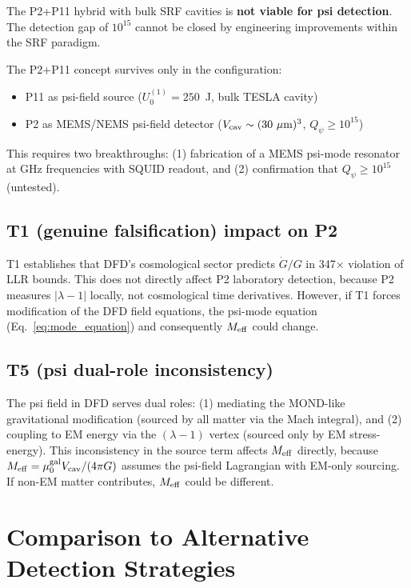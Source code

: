 \documentclass[11pt,twocolumn]{article}
\newcommand{\lam}{\lambda}
\newcommand{\Meff}{M_{\rm eff}}
\newcommand{\Qpsi}{Q_\psi}
\newcommand{\Vcav}{V_{\rm cav}}
\newcommand{\muG}{\mu_0^{\rm gal}}
\theoremstyle{definition}
\theoremstyle{remark}
\begin{document}
The P2+P11 hybrid with bulk SRF cavities is \textbf{not viable for psi
detection}. The detection gap of $10^{15}$ cannot be closed by engineering
improvements within the SRF paradigm.

The P2+P11 concept survives only in the configuration:
\begin{itemize}[nosep]
\item P11 as psi-field source ($U_0^{(1)} = 250$~J, bulk TESLA cavity)
\item P2 as MEMS/NEMS psi-field detector ($\Vcav \sim (30~\mu\text{m})^3$,
  $\Qpsi \geq 10^{15}$)
\end{itemize}

This requires two breakthroughs: (1) fabrication of a MEMS psi-mode
resonator at GHz frequencies with SQUID readout, and (2) confirmation
that $\Qpsi \geq 10^{15}$ (untested).

\subsection{T1 (genuine falsification) impact on P2}
\label{sec:T1_impact}

T1 establishes that DFD's cosmological sector predicts $\dot{G}/G$ in
347$\times$ violation of LLR bounds. This does not directly affect P2
laboratory detection, because P2 measures $|\lam-1|$ locally, not
cosmological time derivatives. However, if T1 forces modification of
the DFD field equations, the psi-mode equation
(Eq.~\ref{eq:mode_equation}) and consequently $\Meff$ could change.

\subsection{T5 (psi dual-role inconsistency)}
\label{sec:T5_impact}

The psi field in DFD serves dual roles: (1) mediating the MOND-like
gravitational modification (sourced by all matter via the Mach integral),
and (2) coupling to EM energy via the $(\lam-1)$ vertex (sourced only
by EM stress-energy). This inconsistency in the source term affects
$\Meff$ directly, because $\Meff = \muG\Vcav/(4\pi G)$ assumes the
psi-field Lagrangian with EM-only sourcing. If non-EM matter contributes,
$\Meff$ could be different.

\section{Comparison to Alternative Detection Strategies}
\label{sec:alternatives}
\end{document}
